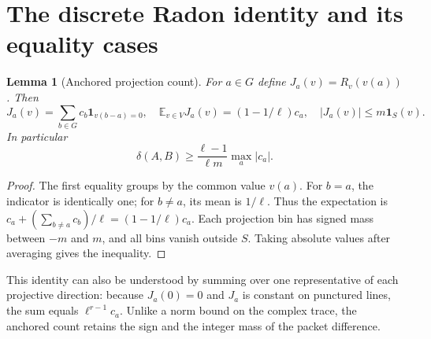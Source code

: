 \documentclass[11pt]{article}
\newtheorem{lemma}[theorem]{Lemma}
\theoremstyle{remark}\newtheorem{remark}[theorem]{Remark}
\newcommand{\E}{\mathbb E}
\newcommand{\one}{\mathbf 1}
\begin{document}
\section{The discrete Radon identity and its equality cases}
\begin{lemma}[Anchored projection count]\label{lem:radon}
For $a\in G$ define $J_a(v)=R_v(v(a))$. Then
\begin{equation}\label{eq:radon}
 J_a(v)=\sum_{b\in G}c_b\one_{v(b-a)=0},\quad
 \E_{v\in V}J_a(v)=(1-1/\ell)c_a,
 \quad |J_a(v)|\le m\one_S(v).
\end{equation}
In particular
\[\delta(A,B)\ge \frac{\ell-1}{\ell m}\max_a|c_a|.\]
\end{lemma}
\begin{proof}
The first equality groups by the common value $v(a)$. For $b=a$, the indicator is identically one; for $b\ne a$, its mean is $1/\ell$. Thus the expectation is $c_a+(\sum_{b\ne a}c_b)/\ell=(1-1/\ell)c_a$. Each projection bin has signed mass between $-m$ and $m$, and all bins vanish outside $S$. Taking absolute values after averaging gives the inequality.
\end{proof}

This identity can also be understood by summing over one representative of each projective direction: because $J_a(0)=0$ and $J_a$ is constant on punctured lines, the sum equals $\ell^{r-1}c_a$. Unlike a norm bound on the complex trace, the anchored count retains the sign and the integer mass of the packet difference.
\end{document}
